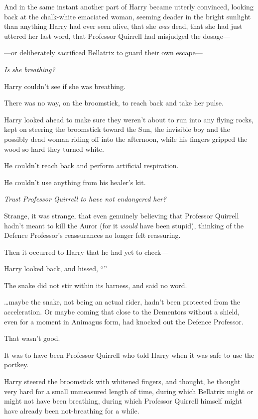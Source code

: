 And in the same instant another part of Harry became utterly convinced, looking back at the chalk-white emaciated woman, seeming deader in the bright sunlight than anything Harry had ever seen alive, that she \emph{was} dead, that she had just uttered her last word, that Professor Quirrell had misjudged the dosage—

—or deliberately sacrificed Bellatrix to guard their own escape—

\emph{Is she breathing?}

Harry couldn’t see if she was breathing.

There was no way, on the broomstick, to reach back and take her pulse.

Harry looked ahead to make sure they weren’t about to run into any flying rocks, kept on steering the broomstick toward the Sun, the invisible boy and the possibly dead woman riding off into the afternoon, while his fingers gripped the wood so hard they turned white.

He couldn’t reach back and perform artificial respiration.

He couldn’t use anything from his healer’s kit.

\emph{Trust Professor Quirrell to have not endangered her?}

Strange, it was strange, that even genuinely believing that Professor Quirrell hadn’t meant to kill the Auror (for it \emph{would} have been stupid), thinking of the Defence Professor’s reassurances no longer felt reassuring.

Then it occurred to Harry that he had yet to check—

Harry looked back, and hissed, “”

The snake did not stir within its harness, and said no word.

…maybe the snake, not being an actual rider, hadn’t been protected from the acceleration. Or maybe coming that close to the Dementors without a shield, even for a moment in Animagus form, had knocked out the Defence Professor.

That wasn’t good.

It was to have been Professor Quirrell who told Harry when it was safe to use the portkey.

Harry steered the broomstick with whitened fingers, and thought, he thought very hard for a small unmeasured length of time, during which Bellatrix might or might not have been breathing, during which Professor Quirrell himself might have already been not-breathing for a while.

